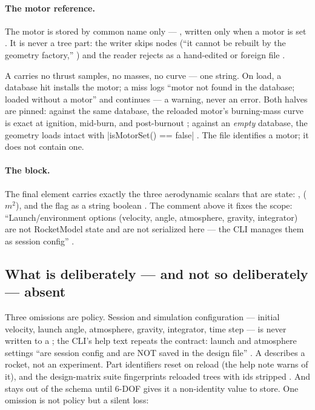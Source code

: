 \paragraph{The motor reference.} The motor is stored by common name only ---
, written only when a motor is set
. It is never a tree part: the writer skips
 nodes (``it cannot be rebuilt by the geometry factory,''
) and the reader rejects  as a
hand-edited or foreign file .

\begin{keyinsight}
A  carries no thrust samples, no masses, no curve --- one string. On load, a
database hit installs the motor; a miss logs ``motor  not found in the
database; loaded without a motor'' and continues 
--- a warning, never an error. Both halves are pinned: against the same database, the
reloaded motor's burning-mass curve is exact at ignition, mid-burn, and post-burnout
; against an \emph{empty} database, the
geometry loads intact with \cppinline|isMotorSet() == false|
. The file identifies a motor; it does not
contain one.
\end{keyinsight}

\paragraph{The  block.} The final element carries exactly the three
aerodynamic scalars that are  state: ,
 ($\unit{m^2}$), and the  flag as a
string boolean . The comment above it fixes the
scope: ``Launch/environment options (velocity, angle, atmosphere, gravity, integrator)
are not RocketModel state and are not serialized here --- the CLI manages them as session
config'' .

\subsection{What is deliberately --- and not so deliberately --- absent}
\label{sec:persistence-unpersisted}

Three omissions are policy. Session and simulation configuration --- initial velocity,
launch angle, atmosphere, gravity, integrator, time step --- is never written to a
; the CLI's help text repeats the contract: launch and atmosphere settings
``are session config and are NOT saved in the design file'' . A
 describes a rocket, not an experiment. Part identifiers reset on reload (the
help note warns of it), and the design-matrix suite fingerprints reloaded trees with ids
stripped . And  stays out of the
schema until 6-DOF gives it a non-identity value to store. One omission is not policy but
a silent loss:

